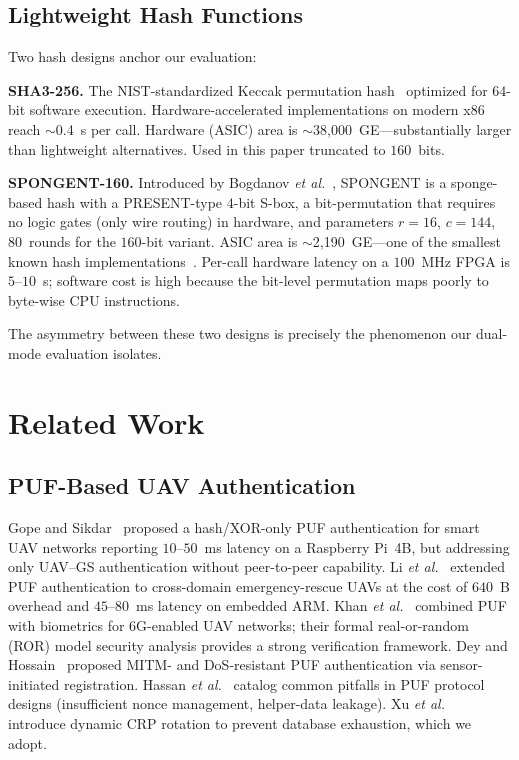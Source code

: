 \documentclass[journal,a4paper,10pt]{IEEEtran}
\begin{document}
\subsection{Lightweight Hash Functions}
Two hash designs anchor our evaluation:

\textbf{SHA3-256.} The NIST-standardized Keccak permutation
hash~\cite{sha3_standard, keccak_team} optimized for $64$-bit software
execution. Hardware-accelerated implementations on modern x86 reach
$\sim$0.4~\textmu s per call. Hardware (ASIC) area is
$\sim$38{,}000~GE---substantially larger than lightweight
alternatives. Used in this paper truncated to $160$~bits.

\textbf{SPONGENT-160.} Introduced by Bogdanov \textit{et
al.}~\cite{spongent_original}, SPONGENT is a sponge-based hash with a
PRESENT-type $4$-bit S-box, a bit-permutation that requires no logic
gates (only wire routing) in hardware, and parameters $r{=}16$,
$c{=}144$, $80$~rounds for the $160$-bit variant. ASIC area is
$\sim$2{,}190~GE---one of the smallest known hash
implementations~\cite{lightweight_crypto_evaluation}. Per-call
hardware latency on a $100$~MHz FPGA is $5$--$10$~\textmu s;
software cost is high because the bit-level permutation maps poorly
to byte-wise CPU instructions.

The asymmetry between these two designs is precisely the phenomenon
our dual-mode evaluation isolates.


\section{Related Work}
\label{sec:related}

\subsection{PUF-Based UAV Authentication}
Gope and Sikdar~\cite{puf_lightweight_uav} proposed a hash/XOR-only
PUF authentication for smart UAV networks reporting $10$--$50$~ms
latency on a Raspberry Pi~4B, but addressing only UAV--GS
authentication without peer-to-peer capability. Li \textit{et
al.}~\cite{puf_uav_cross_domain} extended PUF authentication to
cross-domain emergency-rescue UAVs at the cost of $640$~B overhead
and $45$--$80$~ms latency on embedded ARM. Khan \textit{et
al.}~\cite{puf_6g_uav} combined PUF with biometrics for $6$G-enabled
UAV networks; their formal real-or-random (ROR) model security
analysis provides a strong verification framework. Dey and
Hossain~\cite{puf_mitm_dos} proposed MITM- and DoS-resistant PUF
authentication via sensor-initiated registration. Hassan \textit{et
al.}~\cite{puf_secure_design} catalog common pitfalls in PUF protocol
designs (insufficient nonce management, helper-data leakage). Xu
\textit{et al.}~\cite{arbiter_puf_iot} introduce dynamic CRP rotation
to prevent database exhaustion, which we adopt.
\end{document}
